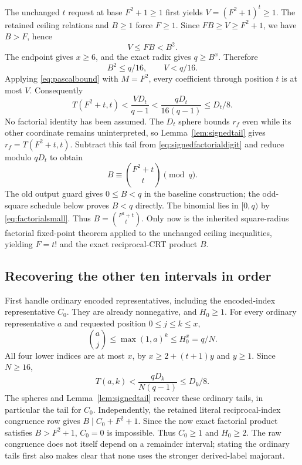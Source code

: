 The unchanged $t$ request at base $F^2+1\ge1$ first yields
$V=(F^2+1)^t\ge1$. The retained ceiling relations and $B\ge1$ force
$F\ge1$. Since $FB\ge V\ge F^2+1$, we have $B>F$, hence
\[
 V\le FB<B^2.
\]
The endpoint gives $x\ge6$, and the exact radix gives $q\ge B^x$.
Therefore
\begin{equation}\label{eq:factorialsmall}
 B^2\le q/16,\qquad V<q/16.
\end{equation}
Applying \eqref{eq:pascalbound} with $M=F^2$, every coefficient through
position $t$ is at most $V$. Consequently
\begin{equation}\label{eq:factorialtail}
 T(F^2+t,t)<\frac{VD_t}{q-1}
 <\frac{qD_t}{16(q-1)}\le D_t/8.
\end{equation}
No factorial identity has been assumed. The $D_t$ sphere bounds $r_f$
even while its other coordinate remains uninterpreted, so
Lemma~\ref{lem:signedtail} gives $r_f=T(F^2+t,t)$.
Subtract this tail from \eqref{eq:signedfactorialdigit} and reduce modulo
$qD_t$ to obtain
\[
 B\equiv\binom{F^2+t}{t}\pmod q.
\]
The old output guard gives $0\le B<q$ in the baseline construction;
the odd-square schedule below proves $B<q$ directly. The binomial lies in
$[0,q)$ by \eqref{eq:factorialsmall}. Thus
$B=\binom{F^2+t}{t}$. Only now is the inherited square-radius factorial
fixed-point theorem applied to the unchanged ceiling inequalities,
yielding $F=t!$ and the exact reciprocal-CRT product $B$.

\subsection{Recovering the other ten intervals in order}
First handle ordinary encoded representatives, including the encoded-index
representative $C_0$. They are already nonnegative, and $H_0\ge1$.
For every ordinary representative $a$ and requested position
$0\le j\le k\le x$,
\[
 \binom aj\le\max(1,a)^k\le H_0^x=q/N.
\]
All four lower indices are at most $x$, by
$x\ge2+(t+1)y$ and $y\ge1$. Since $N\ge16$,
\begin{equation}\label{eq:ordinarytail}
 T(a,k)<\frac{qD_k}{N(q-1)}\le D_k/8.
\end{equation}
The spheres and Lemma~\ref{lem:signedtail} recover these ordinary tails,
in particular the tail for $C_0$. Independently, the retained literal
reciprocal-index congruence row gives $B\mid C_0+F^2+1$.
Since the now exact factorial product satisfies
$B>F^2+1$, $C_0=0$ is impossible. Thus $C_0\ge1$ and $H_0\ge2$.
The raw congruence does not itself depend on a remainder interval; stating
the ordinary tails first also makes clear that none uses the stronger
derived-label majorant.

